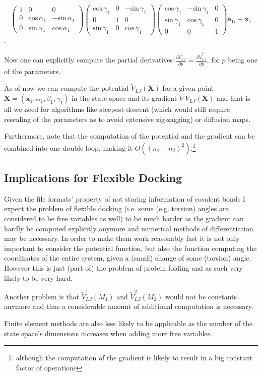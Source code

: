 $$\left(\begin{array}{ccc}
1 & 0 & 0 \\
0 & \text{cos}\,\alpha_1 & -\text{sin}\,\alpha_1 \\
0 & \text{sin}\,\alpha_1 &  \text{cos}\,\alpha_1 \end{array}\right)
\left(\begin{array}{ccc}
\text{cos}\,\gamma_1 & 0 & -\text{sin}\,\gamma_1 \\
0 & 1 & 0\\
\text{sin}\,\gamma_1 & 0 &  \text{cos}\,\gamma_1\end{array}\right)
\left(\begin{array}{ccc}
\text{cos}\,\gamma_1 & -\text{sin}\,\gamma_1 & 0 \\
\text{sin}\,\gamma_1 &  \text{cos}\,\gamma_1 & 0 \\
0 & 0 & 1 \end{array}\right)
\mathbf a_{1i} + \mathbf x_1$$.

Now one can explicitly compute the partial derivatives $\frac{\partial \tilde V_{LJ}}{\partial p} = \frac{\partial \tilde V_{LJ}^3}{\partial p}$, for $p$ being one of the parameters.

As of now we can compute the potential $\tilde V_{LJ}(\mathbf X)$ for a given point $\mathbf X = (\mathbf x_1,\alpha_1,\beta_1,\gamma_1)$ in the state space and its gradient $\nabla \tilde V_{LJ}(\mathbf X)$ and that is all we need for algorithms like steepest descent (which would still require rescaling of the parameters as to avoid extensive zig-zagging) or diffusion maps.

Furthermore, note that the computation of the potential and the gradient can be combined into one double loop, making it $O\left((n_1+n_2)^2\right)$.\footnote{although the computation of the gradient is likely to result in a big constant factor of operations}

\subsection{Implications for Flexible Docking}
Given the file formats' property of not storing information of covalent bonds I expect the problem of flexible docking (i.e. some (e.g. torsion) angles are considered to be free variables as well) to be much harder as the gradient can hardly be computed explicitly anymore and numerical methods of differentiation may be necessary.
In order to make them work reasonably fast it is not only important to consider the potential function, but also the function computing the coordinates of the entire system, given a (small) change of some (torsion) angle.
However this is just (part of) the problem of protein folding and as such very likely to be very hard.

Another problem is that $\tilde V_{LJ}^1(M_1)$ and $\tilde V_{LJ}^2(M_2)$ would not be constants anymore and thus a considerable amount of additional computation is necessary.

Finite element methods are also less likely to be applicable as the number of the state space's dimensions increases when adding more free variables.




